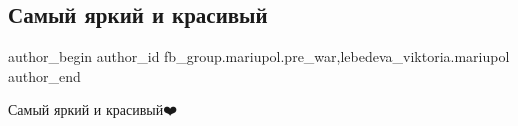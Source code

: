  
 
 
 
 

\subsection{Самый яркий и красивый}
\label{sec:24_02_2023.fb.fb_group.mariupol.pre_war.1.samii_yarkii_i_krasi}
 
\ifcmt
 author_begin
   author_id fb_group.mariupol.pre_war,lebedeva_viktoria.mariupol
 author_end
\fi

Самый яркий и красивый❤️

